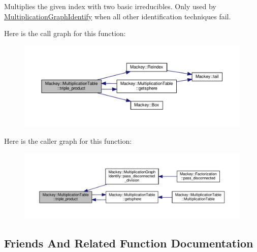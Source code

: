 Multiplies the given index with two basic irreducibles. Only used by \hyperlink{classMackey_1_1MultiplicationGraphIdentify}{Multiplication\+Graph\+Identify} when all other identification techniques fail. 

Here is the call graph for this function\+:\nopagebreak
\begin{figure}[H]
\begin{center}
\leavevmode
\includegraphics[width=350pt]{classMackey_1_1MultiplicationTable_ae2801cd35f426f10c89ab8addb75f829_cgraph}
\end{center}
\end{figure}
Here is the caller graph for this function\+:\nopagebreak
\begin{figure}[H]
\begin{center}
\leavevmode
\includegraphics[width=350pt]{classMackey_1_1MultiplicationTable_ae2801cd35f426f10c89ab8addb75f829_icgraph}
\end{center}
\end{figure}


\subsection{Friends And Related Function Documentation}
\mbox{\label{classMackey_1_1MultiplicationTable_a2b1db64d5f5749a0a14483ef730b755c}} 

